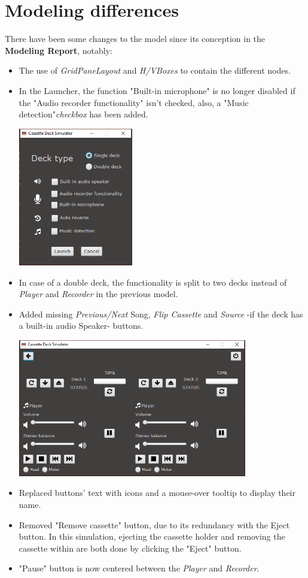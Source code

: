 \documentclass[11pt]{article}
\begin{document}
\section{Modeling differences}
There have been some changes to the model since its conception in the \textbf{Modeling Report}, notably:
\begin{itemize}
\item The use of \textit{GridPaneLayout} and \textit{H/VBoxes }to contain the different nodes.
\item In the Launcher, the function "Built-in microphone" is no longer disabled if the "Audio recorder functionality" isn't checked, also, a "Music detection"\textit{checkbox} has been added.
\begin{center}
\includegraphics[width=5cm]{./img/deckLauncher.png}\\
\end{center}
\item  In case of a double deck, the functionality is split to two decks instead of \textit{Player} and \textit{Recorder} in the previous model.
\item Added missing \textit{Previous/Next} Song, \textit{Flip Cassette} and \textit{Source} -if the deck has a built-in audio Speaker- buttons.
\begin{center}
\includegraphics[width=10cm]{./img/doubleDeck_noF.png}\\
\end{center}
\item Replaced buttons' text with icons and a mouse-over tooltip to display their name.
\item Removed "Remove cassette" button, due to its redundancy with the Eject button. In this simulation, ejecting the cassette holder and removing the cassette within are both done by clicking the "Eject" button.
\item "Pause" button is now centered between the \textit{Player} and \textit{Recorder}.

\end{itemize}
\end{document}
